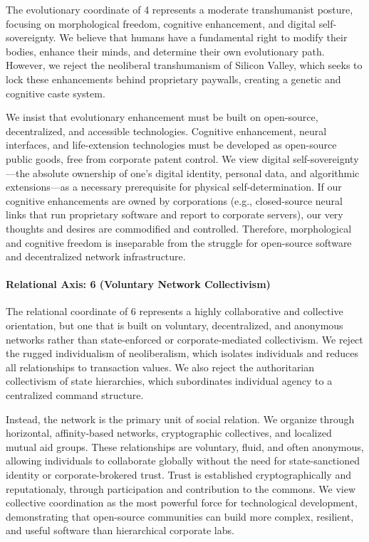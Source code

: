 The evolutionary coordinate of 4 represents a moderate transhumanist
posture, focusing on morphological freedom, cognitive enhancement, and
digital self-sovereignty. We believe that humans have a fundamental
right to modify their bodies, enhance their minds, and determine their
own evolutionary path. However, we reject the neoliberal transhumanism
of Silicon Valley, which seeks to lock these enhancements behind
proprietary paywalls, creating a genetic and cognitive caste system.

We insist that evolutionary enhancement must be built on open-source,
decentralized, and accessible technologies. Cognitive enhancement,
neural interfaces, and life-extension technologies must be developed as
open-source public goods, free from corporate patent control. We view
digital self-sovereignty---the absolute ownership of one's digital
identity, personal data, and algorithmic extensions---as a necessary
prerequisite for physical self-determination. If our cognitive
enhancements are owned by corporations (e.g., closed-source neural links
that run proprietary software and report to corporate servers), our very
thoughts and desires are commodified and controlled. Therefore,
morphological and cognitive freedom is inseparable from the struggle for
open-source software and decentralized network infrastructure.

\paragraph{Relational Axis: 6 (Voluntary Network
Collectivism)}\label{relational-axis-6-voluntary-network-collectivism}

The relational coordinate of 6 represents a highly collaborative and
collective orientation, but one that is built on voluntary,
decentralized, and anonymous networks rather than state-enforced or
corporate-mediated collectivism. We reject the rugged individualism of
neoliberalism, which isolates individuals and reduces all relationships
to transaction values. We also reject the authoritarian collectivism of
state hierarchies, which subordinates individual agency to a centralized
command structure.

Instead, the network is the primary unit of social relation. We organize
through horizontal, affinity-based networks, cryptographic collectives,
and localized mutual aid groups. These relationships are voluntary,
fluid, and often anonymous, allowing individuals to collaborate globally
without the need for state-sanctioned identity or corporate-brokered
trust. Trust is established cryptographically and reputationaly, through
participation and contribution to the commons. We view collective
coordination as the most powerful force for technological development,
demonstrating that open-source communities can build more complex,
resilient, and useful software than hierarchical corporate labs.

